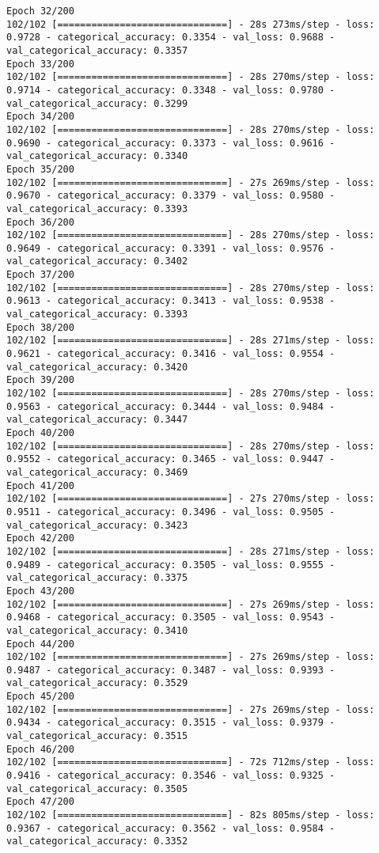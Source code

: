 \begin{lstlisting}
Epoch 32/200
102/102 [==============================] - 28s 273ms/step - loss: 0.9728 - categorical_accuracy: 0.3354 - val_loss: 0.9688 - val_categorical_accuracy: 0.3357
Epoch 33/200
102/102 [==============================] - 28s 270ms/step - loss: 0.9714 - categorical_accuracy: 0.3348 - val_loss: 0.9780 - val_categorical_accuracy: 0.3299
Epoch 34/200
102/102 [==============================] - 28s 270ms/step - loss: 0.9690 - categorical_accuracy: 0.3373 - val_loss: 0.9616 - val_categorical_accuracy: 0.3340
Epoch 35/200
102/102 [==============================] - 27s 269ms/step - loss: 0.9670 - categorical_accuracy: 0.3379 - val_loss: 0.9580 - val_categorical_accuracy: 0.3393
Epoch 36/200
102/102 [==============================] - 28s 270ms/step - loss: 0.9649 - categorical_accuracy: 0.3391 - val_loss: 0.9576 - val_categorical_accuracy: 0.3402
Epoch 37/200
102/102 [==============================] - 28s 270ms/step - loss: 0.9613 - categorical_accuracy: 0.3413 - val_loss: 0.9538 - val_categorical_accuracy: 0.3393
Epoch 38/200
102/102 [==============================] - 28s 271ms/step - loss: 0.9621 - categorical_accuracy: 0.3416 - val_loss: 0.9554 - val_categorical_accuracy: 0.3420
Epoch 39/200
102/102 [==============================] - 28s 270ms/step - loss: 0.9563 - categorical_accuracy: 0.3444 - val_loss: 0.9484 - val_categorical_accuracy: 0.3447
Epoch 40/200
102/102 [==============================] - 28s 270ms/step - loss: 0.9552 - categorical_accuracy: 0.3465 - val_loss: 0.9447 - val_categorical_accuracy: 0.3469
Epoch 41/200
102/102 [==============================] - 27s 270ms/step - loss: 0.9511 - categorical_accuracy: 0.3496 - val_loss: 0.9505 - val_categorical_accuracy: 0.3423
Epoch 42/200
102/102 [==============================] - 28s 271ms/step - loss: 0.9489 - categorical_accuracy: 0.3505 - val_loss: 0.9555 - val_categorical_accuracy: 0.3375
Epoch 43/200
102/102 [==============================] - 27s 269ms/step - loss: 0.9468 - categorical_accuracy: 0.3505 - val_loss: 0.9543 - val_categorical_accuracy: 0.3410
Epoch 44/200
102/102 [==============================] - 27s 269ms/step - loss: 0.9487 - categorical_accuracy: 0.3487 - val_loss: 0.9393 - val_categorical_accuracy: 0.3529
Epoch 45/200
102/102 [==============================] - 27s 269ms/step - loss: 0.9434 - categorical_accuracy: 0.3515 - val_loss: 0.9379 - val_categorical_accuracy: 0.3515
Epoch 46/200
102/102 [==============================] - 72s 712ms/step - loss: 0.9416 - categorical_accuracy: 0.3546 - val_loss: 0.9325 - val_categorical_accuracy: 0.3505
Epoch 47/200
102/102 [==============================] - 82s 805ms/step - loss: 0.9367 - categorical_accuracy: 0.3562 - val_loss: 0.9584 - val_categorical_accuracy: 0.3352

\end{lstlisting}
